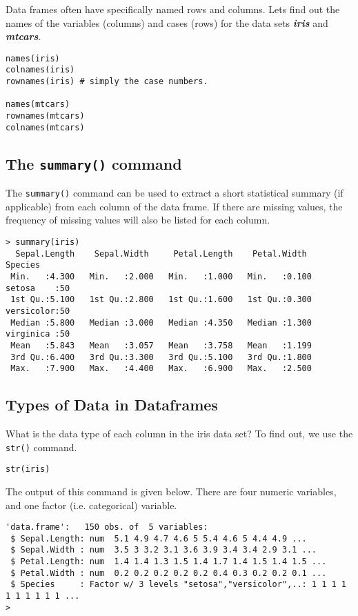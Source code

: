 \documentclass[12pt]{article}
\begin{document}
Data frames often have specifically named rows and columns. 
Lets find out the names of the variables (columns) and cases (rows) for the data sets \textit{\textbf{iris}} and \textit{\textbf{mtcars}}.

\begin{framed}
\begin{verbatim}
names(iris)
colnames(iris)
rownames(iris) # simply the case numbers.

names(mtcars)
rownames(mtcars)
colnames(mtcars)
\end{verbatim}
\end{framed}

\newpage
\subsection*{The \texttt{summary()} command}
The \texttt{summary()} command can be used to extract a short statistical summary (if applicable) from each column of the data frame. 
If there are missing values, the frequency of missing values will also be listed for each column.

\begin{verbatim}
> summary(iris)
  Sepal.Length    Sepal.Width     Petal.Length    Petal.Width          Species  
 Min.   :4.300   Min.   :2.000   Min.   :1.000   Min.   :0.100   setosa    :50  
 1st Qu.:5.100   1st Qu.:2.800   1st Qu.:1.600   1st Qu.:0.300   versicolor:50  
 Median :5.800   Median :3.000   Median :4.350   Median :1.300   virginica :50  
 Mean   :5.843   Mean   :3.057   Mean   :3.758   Mean   :1.199                  
 3rd Qu.:6.400   3rd Qu.:3.300   3rd Qu.:5.100   3rd Qu.:1.800                  
 Max.   :7.900   Max.   :4.400   Max.   :6.900   Max.   :2.500                
\end{verbatim}


\newpage
\subsection*{Types of Data in Dataframes}
What is the data type of each column in the iris data set? To find out, we use the \texttt{str()} command.

\begin{framed}
\begin{verbatim}
str(iris)
\end{verbatim}
\end{framed}
The output of this command is given below. There are four numeric variables, and one factor (i.e. categorical) variable.
\begin{verbatim}
'data.frame':   150 obs. of  5 variables:
 $ Sepal.Length: num  5.1 4.9 4.7 4.6 5 5.4 4.6 5 4.4 4.9 ...
 $ Sepal.Width : num  3.5 3 3.2 3.1 3.6 3.9 3.4 3.4 2.9 3.1 ...
 $ Petal.Length: num  1.4 1.4 1.3 1.5 1.4 1.7 1.4 1.5 1.4 1.5 ...
 $ Petal.Width : num  0.2 0.2 0.2 0.2 0.2 0.4 0.3 0.2 0.2 0.1 ...
 $ Species     : Factor w/ 3 levels "setosa","versicolor",..: 1 1 1 1 1 1 1 1 1 1 ...
> 
\end{verbatim}
\end{document}
